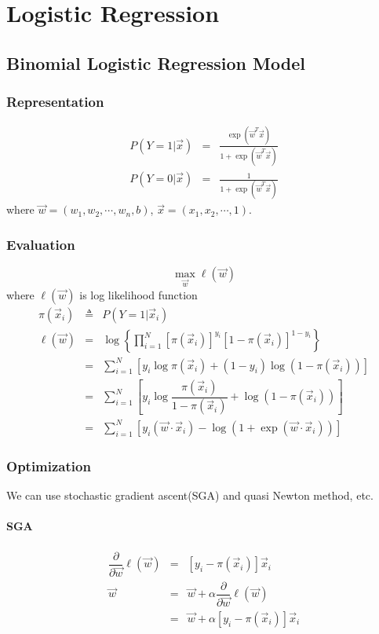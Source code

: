 \chapter{Logistic Regression}


\section{Binomial Logistic Regression Model}


\subsection{Representation}

\begin{eqnarray}
  P(Y=1|\vec{x}) &=& \frac{\exp(\vec{w}^T\vec{x})}{1+\exp(\vec{w}^T\vec{x})} \\
  P(Y=0|\vec{x}) &=& \frac{1}{1+\exp(\vec{w}^T\vec{x})}
\end{eqnarray}
where $\vec{w}=(w_1, w_2,\cdots, w_n, b)$, $\vec{x}=(x_1,x_2,\cdots, 1)$.


\subsection{Evaluation}
\begin{equation}
\max_{\vec{w}} \ell(\vec{w})
\end{equation}
where $\ell(\vec{w})$ is log likelihood function
\begin{eqnarray*}
\pi(\vec{x}_i) & \triangleq & P(Y=1|\vec{x}_i) \\
\ell(\vec{w}) &=& \log\left\{\prod\limits_{i=1}^N{\left[\pi(\vec{x}_i)\right]^{y_i}\left[1-\pi(\vec{x}_i)\right]^{1-y_i}}\right\} \\
           &=& \sum\limits_{i=1}^N\left[y_i\log\pi(\vec{x}_i)+(1-y_i)\log(1-\pi(\vec{x}_i))\right] \\
		   &=& \sum\limits_{i=1}^N\left[y_i\log\dfrac{\pi(\vec{x}_i)}{1-\pi(\vec{x}_i)}+\log(1-\pi(\vec{x}_i))\right] \\
		   &=& \sum\limits_{i=1}^N\left[y_i(\vec{w}\cdot\vec{x}_i)-\log(1+\exp(\vec{w}\cdot\vec{x}_i))\right]
\end{eqnarray*}


\subsection{Optimization}
We can use stochastic gradient ascent(SGA) and quasi Newton method, etc.


\subsubsection{SGA}
\begin{eqnarray}
\dfrac{\partial}{\partial \vec{w}}\ell(\vec{w}) &=& \left[y_i - \pi(\vec{x}_i) \right]\vec{x}_i \\
\vec{w} &=& \vec{w}+\alpha\dfrac{\partial}{\partial \vec{w}}\ell(\vec{w}) \nonumber \\
        &=& \vec{w} + \alpha\left[y_i - \pi(\vec{x}_i) \right]\vec{x}_i
\end{eqnarray}
